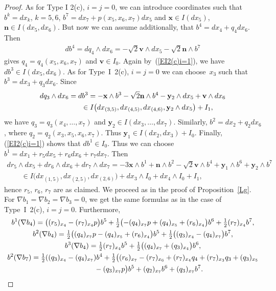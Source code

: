 \documentclass[11pt]{article}
\numberwithin{equation}{section}
\newcommand\bx{{\mathbf x}}
\newcommand\by{{\mathbf y}}
\newcommand\bn{{\mathbf n}}
\newcommand\bv{{\mathbf v}}
\begin{document}
\begin{proof} As for Type I 2(c), $i=j=0$, we can introduce coordinates such that $b^k=dx_k$, $k=5,6$, $b^7= dx_7 +p(x_5,x_6,x_7)dx_5$ and	 $\bx\in I(dx_5)$, $\bn\in I(dx_5,dx_6)$. But now we can assume additionally, that $b^4=dx_4+q_4 dx_6$. Then
\begin{gather*}db^4=dq_4\wedge dx_6=-\sqrt2\bv\wedge dx_5-\sqrt 2 \bn\wedge b^7\end{gather*} gives $q_4=q_4(x_5,x_6,x_7)$ and $\bv\in I_0$.
Again by~(\ref{EI2(c)i=1}), we have $db^3\in I(dx_5,dx_6)$. As for Type~I~2(c), $i=j=0$ we can choose~$x_3$ such that $b^3=dx_3+q_3dx_6$. Since
\begin{gather*}
dq_3\wedge dx_6 = db^3=-\bx\wedge b^3 -\sqrt 2\bn\wedge b^4-\by_2\wedge dx_5+\bv\wedge dx_6\\
\hphantom{dq_3\wedge dx_6}{} \in I\big(dx_{(3,5)}, dx_{(4,5)}, dx_{(4,6)}, \by_2\wedge dx_5\big)+I_1,
\end{gather*}
we have $q_3=q_3(x_4,\dots,x_7)$ and $\by_2\in I(dx_3,\dots,dx_7)$.
Similarly, $b^2=dx_2+q_2dx_6$, where $q_2=q_2(x_3,x_5,x_6,x_7)$. Thus $\by_1\in I(dx_2,dx_3)+I_0$. Finally, (\ref{EI2(c)i=1}) shows that $db^1\in I_0$. Thus we can choose $b^1=dx_1+ r_5dx_5+r_6dx_6+r_7dx_7$. Then
\begin{gather*}
 dr_5\wedge dx_5+dr_6\wedge dx_6+dr_7\wedge dx_7= -3\bx\wedge b^1+\bn\wedge b^2-\sqrt2\bv\wedge b^4+\by_1\wedge b^6+\by_2\wedge b^7 \\
 \qquad{}\in I\big( dx_{(1,5)}, dx_{(2,5)}, dx_{(2,6)}\big)+ dx_3\wedge I_0 +dx_4\wedge I_0+I_1,
\end{gather*}
hence $r_5$, $r_6$, $r_7$ are as claimed. We proceed as in the proof of Proposition~\ref{Lg}. For $\nabla b_1=\nabla b_2=\nabla b_3 =0$, we get the same formulas as in the case of Type~I~2(c), $i=j=0$. Furthermore,
\begin{gather*}
b^1(\nabla b_4)= \big((r_5)_{x_4}-(r_7)_{x_4}p\big)b^5+\tfrac12\big({-}(q_4)_{x_7}p+(q_4)_{x_5}+(r_6)_{x_4} \big)b^6 + \tfrac12(r_7)_{x_4}b^7,\\
b^2(\nabla b_4)= \tfrac12\big((q_4)_{x_7}p-(q_4)_{x_5}+(r_6)_{x_4}\big)b^5 +\tfrac12\big((q_3)_{x_4}-(q_4)_{x_7}\big)b^7,\\
b^3(\nabla b_4)= \tfrac12(r_7)_{x_4}b^5+\tfrac12\big((q_4)_{x_7}+(q_3)_{x_4}\big)b^6,\\
b^2(\nabla b_7)= \tfrac12((q_3)_{x_4}-(q_4)_{x_7})b^4 +\tfrac12\big((r_6)_{x_7} -(r_7)_{x_6}+(r_7)_{x_4}q_4+(r_7)_{x_3}q_3+(q_3)_{x_5} \\
\hphantom{b^2(\nabla b_7)=}{} -(q_3)_{x_7}p\big)b^5 +(q_2)_{x_7}b^6 +(q_3)_{x_7}b^7.

\end{gather*}
\end{proof}
\end{document}
